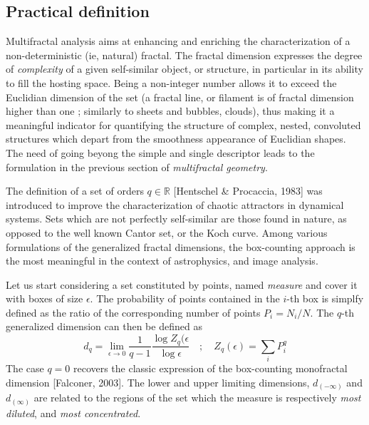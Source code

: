 \subsection{Practical definition}
Multifractal analysis aims at enhancing and enriching the characterization of a non-deterministic (ie, natural) fractal. The fractal dimension expresses the degree of \emph{complexity} of a given self-similar object, or structure, in particular in its ability to fill the hosting space. Being a non-integer number allows it to exceed the Euclidian dimension of the set (a fractal line, or filament is of fractal dimension higher than one ; similarly to sheets and bubbles, clouds), thus making it a meaningful indicator for quantifying the structure of complex, nested, convoluted structures which depart from the smoothness appearance of Euclidian shapes. The need of going beyong the simple and single descriptor leads to the formulation in the previous section of \emph{multifractal geometry}.

The definition of a set of orders $q\in\mathbb{R}$ [Hentschel \& Procaccia, 1983] was introduced to improve the characterization of chaotic attractors in dynamical systems. Sets which are not perfectly self-similar are those found in nature, as opposed to the well known Cantor set, or the Koch curve. Among various formulations of the generalized fractal dimensions, the box-counting approach is the most meaningful in the context of astrophysics, and image analysis. 

Let us start considering a set constituted by points, named \emph{measure} and cover it with boxes of size $\epsilon$. The probability of points contained in the $i$-th box is simplfy defined as the ratio of the corresponding number of points $\displaystyle P_i=N_i/N$. The $q$-th generalized dimension can then be defined as 
\begin{equation}
    d_q=\lim_{\epsilon\rightarrow0}\frac{1}{q-1}\frac{\log Z_q(\epsilon}{\log\epsilon}\quad;\quad Z_q(\epsilon)=\sum_iP_i^q
\end{equation}
The case $q=0$ recovers the classic expression of the box-counting monofractal dimension [Falconer, 2003].
The lower and upper limiting dimensions, $d_{(-\infty)}$ and $d_{(\infty)}$ are related to the regions of the set  which the measure is respectively \emph{most diluted}, and \emph{most concentrated}. 

